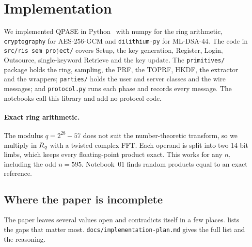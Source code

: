 \section{Implementation}
\label{sec:implementation}

We implemented QPASE in Python~\MachinePython{} with numpy for the ring arithmetic, \texttt{cryptography} for
AES-256-GCM and \texttt{dilithium-py} for ML-DSA-44. The code in \texttt{src/ris\_sem\_project/} covers Setup, the
key generation, Register, Login, Outsource, single-keyword Retrieve and the key update. The \texttt{primitives/}
package holds the ring, sampling, the PRF, the TOPRF, HKDF, the extractor and the wrappers; \texttt{parties/} holds
the user and server classes and the wire messages; and \texttt{protocol.py} runs each phase and records every
message. The notebooks call this library and add no protocol code.

\paragraph{Exact ring arithmetic.} The modulus $q = 2^{28} - 57$ does not suit the number-theoretic transform, so we
multiply in $R_q$ with a twisted complex FFT. Each operand is split into two 14-bit limbs, which keeps every
floating-point product exact. This works for any $n$, including the odd $n = 595$. Notebook~01 finds
\RingProductsExact{} random products equal to an exact reference.

\subsection{Where the paper is incomplete}
\label{sec:decisions}

The paper leaves several values open and contradicts itself in a few places.  lists the gaps
that matter most. \texttt{docs/implementation-plan.md} gives the full list and the reasoning.

